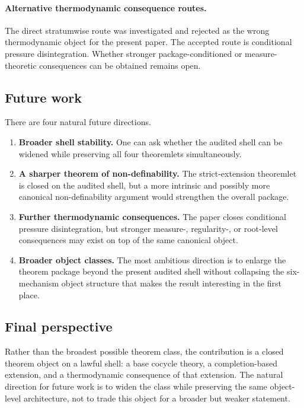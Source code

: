 \paragraph{Alternative thermodynamic consequence routes.}
The direct stratumwise route was investigated and rejected as the wrong thermodynamic object for the present paper. The accepted route is conditional pressure disintegration. Whether stronger package-conditioned or measure-theoretic consequences can be obtained remains open.

\subsection{Future work}

There are four natural future directions.

\begin{enumerate}
    \item \textbf{Broader shell stability.}
    One can ask whether the audited shell can be widened while preserving all four theoremlets simultaneously.

    \item \textbf{A sharper theorem of non-definability.}
    The strict-extension theoremlet is closed on the audited shell, but a more intrinsic and possibly more canonical non-definability argument would strengthen the overall package.

    \item \textbf{Further thermodynamic consequences.}
    The paper closes conditional pressure disintegration, but stronger measure-, regularity-, or root-level consequences may exist on top of the same canonical object.

    \item \textbf{Broader object classes.}
    The most ambitious direction is to enlarge the theorem package beyond the present audited shell without collapsing the six-mechanism object structure that makes the result interesting in the first place.
\end{enumerate}

\subsection{Final perspective}

Rather than the broadest possible theorem class, the contribution is a closed theorem object on a lawful shell: a base cocycle theory, a completion-based extension, and a thermodynamic consequence of that extension. The natural direction for future work is to widen the class while preserving the same object-level architecture, not to trade this object for a broader but weaker statement.

